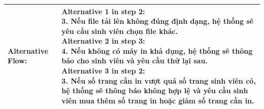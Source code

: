 \begin{table}[h!]
\begin{tabular}{ |p{4cm}|p{3cm}|p{3cm}|p{3cm}|  }
		\hline
		Alternative Flow: & \multicolumn{3}{p{10cm}|}{
			Alternative 1 in step 2:\newline
			3. Nếu file tải lên không đúng định dạng, hệ thống sẽ yêu cầu sinh viên chọn file khác.\newline
			Alternative 2 in step 3:\newline
			4. Nếu không có máy in khả dụng, hệ thống sẽ thông báo cho sinh viên và yêu cầu thử lại sau.\newline
			Alternative 3 in step 2:\newline
			3. Nếu số trang cần in vượt quá số trang sinh viên có, hệ thống sẽ thông báo không hợp lệ và yêu cầu sinh viên mua thêm số trang in
			hoặc giảm số trang cần in.

		}                                                                                                                                             \\
		\hline
	\end{tabular}
\end{table}
\newpage

